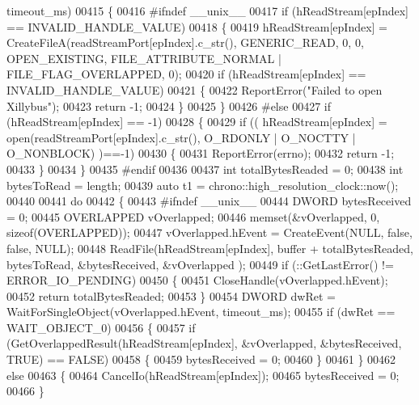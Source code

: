 \begin{DoxyCode}
      timeout_ms)
00415 \{
00416 \textcolor{preprocessor}{#ifndef \_\_unix\_\_}
00417     \textcolor{keywordflow}{if} (hReadStream[epIndex] == INVALID\_HANDLE\_VALUE)
00418     \{
00419         hReadStream[epIndex] = CreateFileA(readStreamPort[epIndex].c\_str(), GENERIC\_READ, 0, 0, 
      OPEN\_EXISTING, FILE\_ATTRIBUTE\_NORMAL | FILE\_FLAG\_OVERLAPPED, 0);
00420         \textcolor{keywordflow}{if} (hReadStream[epIndex] == INVALID\_HANDLE\_VALUE)
00421         \{
00422             ReportError(\textcolor{stringliteral}{"Failed to open Xillybus"});
00423             \textcolor{keywordflow}{return} -1;
00424         \}
00425     \}
00426 \textcolor{preprocessor}{#else}
00427     \textcolor{keywordflow}{if} (hReadStream[epIndex] == -1)
00428     \{
00429        \textcolor{keywordflow}{if} (( hReadStream[epIndex] = open(readStreamPort[epIndex].c\_str(), O\_RDONLY | O\_NOCTTY | O\_NONBLOCK)
      )==-1)
00430        \{
00431             ReportError(errno);
00432             \textcolor{keywordflow}{return} -1;
00433        \}
00434     \}
00435 \textcolor{preprocessor}{#endif}
00436 
00437     \textcolor{keywordtype}{int} totalBytesReaded = 0;
00438     \textcolor{keywordtype}{int} bytesToRead = length;
00439     \textcolor{keyword}{auto} t1 = chrono::high\_resolution\_clock::now();
00440 
00441     \textcolor{keywordflow}{do}
00442     \{
00443 \textcolor{preprocessor}{ #ifndef \_\_unix\_\_}
00444         DWORD bytesReceived = 0;
00445         OVERLAPPED  vOverlapped;
00446         memset(&vOverlapped, 0, \textcolor{keyword}{sizeof}(OVERLAPPED));
00447         vOverlapped.hEvent = CreateEvent(NULL, \textcolor{keyword}{false}, \textcolor{keyword}{false}, NULL);
00448         ReadFile(hReadStream[epIndex], buffer + totalBytesReaded, bytesToRead, &bytesReceived, &vOverlapped
      );
00449         \textcolor{keywordflow}{if} (::GetLastError() != ERROR\_IO\_PENDING)
00450         \{
00451             CloseHandle(vOverlapped.hEvent);
00452             \textcolor{keywordflow}{return} totalBytesReaded;
00453         \}
00454         DWORD dwRet = WaitForSingleObject(vOverlapped.hEvent, timeout\_ms);
00455         \textcolor{keywordflow}{if} (dwRet == WAIT\_OBJECT\_0)
00456         \{
00457             \textcolor{keywordflow}{if} (GetOverlappedResult(hReadStream[epIndex], &vOverlapped, &bytesReceived, TRUE) == FALSE)
00458             \{
00459                 bytesReceived = 0;
00460             \}
00461         \}
00462         \textcolor{keywordflow}{else}
00463         \{
00464             CancelIo(hReadStream[epIndex]);
00465             bytesReceived = 0;
00466         \}

\end{DoxyCode}
